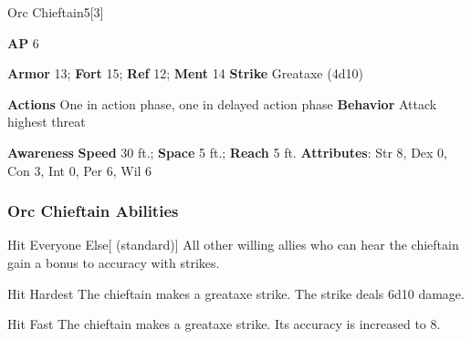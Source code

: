 \begin{monsection}{Orc Chieftain}{5}[3]
\vspace{-1em}\vspace{-1em}
\begin{spellcontent}
\begin{spelltargetinginfo}
{\textbf{AP} 6}

\pari \textbf{Armor} 13;
\textbf{Fort} 15;
\textbf{Ref} 12;
\textbf{Ment} 14
\pari \textbf{Strike} Greataxe  (4d10)


\pari \textbf{Actions} One in action phase, one in delayed action phase
\pari \textbf{Behavior} Attack highest threat
\end{spelltargetinginfo}
\end{spellcontent}

\begin{monsterfooter}
\pari \textbf{Awareness} 
\pari \textbf{Speed} 30 ft.;
\textbf{Space} 5 ft.;
\textbf{Reach} 5 ft.
\pari \textbf{Attributes}:
Str 8,
Dex 0,
Con 3,
Int 0,
Per 6,
Wil 6
\end{monsterfooter}
\end{monsection}


\subsubsection{Orc Chieftain Abilities}

\begin{ability}{Hit Everyone Else}[ (standard)]
All other willing allies who can hear the chieftain gain a  bonus to accuracy with strikes.
\end{ability}

\vspace{0.5em}
\begin{ability}{Hit Hardest}
The chieftain makes a greataxe strike.
The strike deals 6d10 damage.
\end{ability}

\vspace{0.5em}
\begin{ability}{Hit Fast}
The chieftain makes a greataxe strike.
Its accuracy is increased to 8.
\end{ability}

